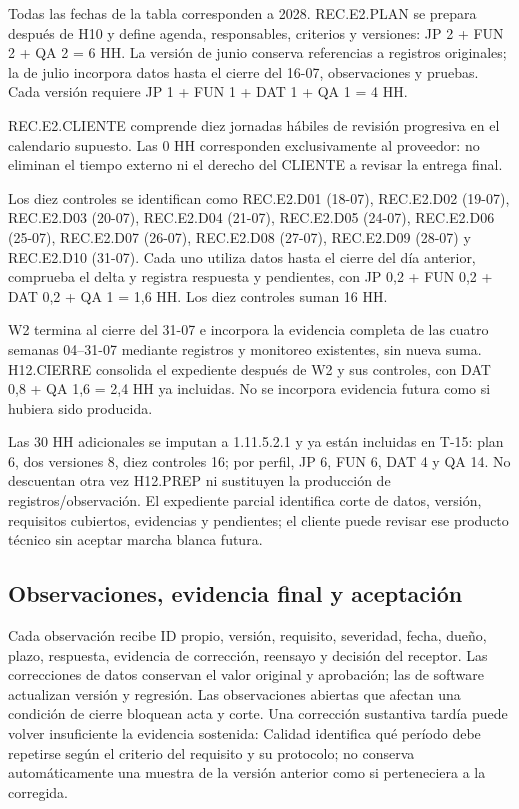 Todas las fechas de la tabla corresponden a 2028. REC.E2.PLAN se prepara después de H10 y define agenda, responsables, criterios y versiones: JP 2 + FUN 2 + QA 2 = 6 HH. La versión de junio conserva referencias a registros originales; la de julio incorpora datos hasta el cierre del 16-07, observaciones y pruebas. Cada versión requiere JP 1 + FUN 1 + DAT 1 + QA 1 = 4 HH.

REC.E2.CLIENTE comprende diez jornadas hábiles de revisión progresiva en el calendario supuesto. Las 0 HH corresponden exclusivamente al proveedor: no eliminan el tiempo externo ni el derecho del CLIENTE a revisar la entrega final.

Los diez controles se identifican como REC.E2.D01 (18-07), REC.E2.D02 (19-07), REC.E2.D03 (20-07), REC.E2.D04 (21-07), REC.E2.D05 (24-07), REC.E2.D06 (25-07), REC.E2.D07 (26-07), REC.E2.D08 (27-07), REC.E2.D09 (28-07) y REC.E2.D10 (31-07). Cada uno utiliza datos hasta el cierre del día anterior, comprueba el delta y registra respuesta y pendientes, con JP 0,2 + FUN 0,2 + DAT 0,2 + QA 1 = 1,6 HH. Los diez controles suman 16 HH.

W2 termina al cierre del 31-07 e incorpora la evidencia completa de las cuatro semanas 04--31-07 mediante registros y monitoreo existentes, sin nueva suma. H12.CIERRE consolida el expediente después de W2 y sus controles, con DAT 0,8 + QA 1,6 = 2,4 HH ya incluidas. No se incorpora evidencia futura como si hubiera sido producida.


Las 30 HH adicionales se imputan a 1.11.5.2.1 y ya están incluidas en T-15: plan 6, dos versiones 8, diez controles 16; por perfil, JP 6, FUN 6, DAT 4 y QA 14. No descuentan otra vez H12.PREP ni sustituyen la producción de registros/observación. El expediente parcial identifica corte de datos, versión, requisitos cubiertos, evidencias y pendientes; el cliente puede revisar ese producto técnico sin aceptar marcha blanca futura.

\subsection{Observaciones, evidencia final y aceptación}
Cada observación recibe ID propio, versión, requisito, severidad, fecha, dueño, plazo, respuesta, evidencia de corrección, reensayo y decisión del receptor. Las correcciones de datos conservan el valor original y aprobación; las de software actualizan versión y regresión. Las observaciones abiertas que afectan una condición de cierre bloquean acta y corte. Una corrección sustantiva tardía puede volver insuficiente la evidencia sostenida: Calidad identifica qué período debe repetirse según el criterio del requisito y su protocolo; no conserva automáticamente una muestra de la versión anterior como si perteneciera a la corregida.

